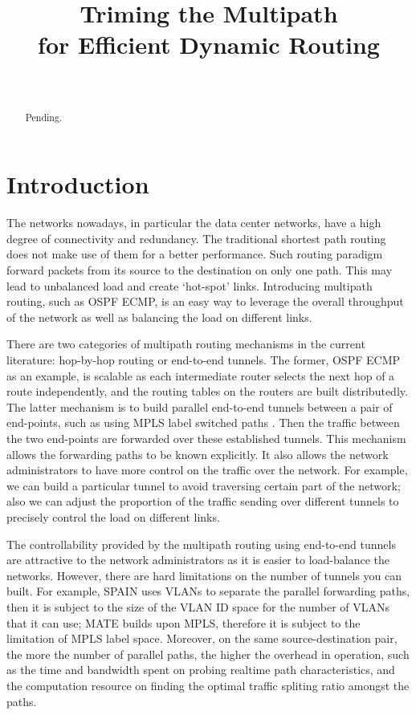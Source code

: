 \documentclass[conference]{IEEEtran}
\title{Triming the Multipath\\ for Efficient Dynamic Routing}
\author{
\IEEEauthorblockN{Adrian S.-W. Tam \hspace{2em}
Kang Xi \hspace{2em}
H. Jonathan Chao}\\
\IEEEauthorblockA{Department of Electrical and Computer Engineering\\
Polytechnic Institute of
New York University\\
Email: adriantam@nyu.edu, kxi@poly.edu, chao@poly.edu}
}
\begin{document}
\maketitle

\begin{abstract}
Pending.
\end{abstract}

\section{Introduction}\label{sec:intro}
The networks nowadays, in particular the data center networks, have a high
degree of connectivity and redundancy. The traditional shortest path routing
does not make use of them for a better performance. Such routing paradigm
forward packets from its source to the destination on only one path. This may
lead to unbalanced load and create `hot-spot' links. Introducing multipath
routing, such as OSPF \cite{rfc2328} ECMP, is an easy way to leverage the
overall throughput of the network as well as balancing the load on different
links.

There are two categories of multipath routing mechanisms in the current
literature: hop-by-hop routing or end-to-end tunnels. The former, OSPF ECMP as
an example, is scalable as each intermediate router selects the next hop of a
route independently, and the routing tables on the routers are built
distributedly. The latter mechanism is to build parallel end-to-end tunnels
between a pair of end-points, such as using MPLS label switched paths
\cite{rfc3031}. Then the traffic between the two end-points are forwarded over
these established tunnels. This mechanism allows the forwarding paths to be
known explicitly. It also allows the network administrators to have more
control on the traffic over the network. For example, we can build a particular
tunnel to avoid traversing certain part of the network; also we can adjust the
proportion of the traffic sending over different tunnels to precisely control
the load on different links.

The controllability provided by the multipath routing using end-to-end tunnels
are attractive to the network administrators as it is easier to load-balance
the networks. However, there are hard limitations on the number of tunnels you
can built. For example, SPAIN \cite{myam10} uses VLANs to separate the parallel
forwarding paths, then it is subject to the size of the VLAN ID space for the
number of VLANs that it can use; MATE \cite{ejlw01} builds upon MPLS, therefore
it is subject to the limitation of MPLS label space. Moreover, on the same
source-destination pair, the more the number of parallel paths, the higher the
overhead in operation, such as the time and bandwidth spent on probing realtime
path characteristics, and the computation resource on finding the optimal
traffic spliting ratio amongst the paths.
\end{document}
